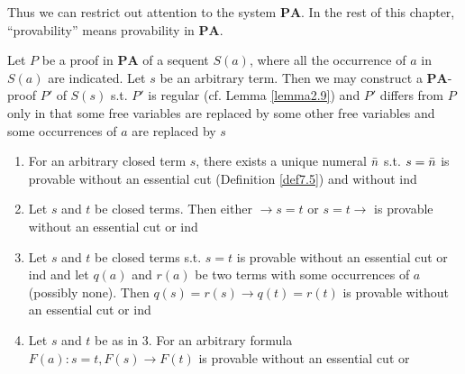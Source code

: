 \documentclass[11pt]{article}
\def \PA {\textbf{PA}}
\begin{document}
Thus we can restrict out attention to the system \(\PA\). In the rest of this chapter,
``provability'' means provability in \(\PA\).

\begin{proposition}[]
Let \(P\) be a proof in \(\PA\) of a sequent \(S(a)\), where all the occurrence of \(a\)
in \(S(a)\) are indicated. Let \(s\) be an arbitrary term. Then we may construct
a \(\PA\)-proof \(P'\) of \(S(s)\) s.t. \(P'\) is regular (cf. Lemma \ref{lemma2.9}) and \(P'\)
differs from \(P\) only in that some free variables are replaced by some other free variables and
some occurrences of \(a\) are replaced by \(s\)
\end{proposition}

\begin{lemma}[]
\label{lemma9.6}
\begin{enumerate}
\item For an arbitrary closed term \(s\), there exists a unique numeral \(\bar{n}\) s.t. \(s=\bar{n}\)
is provable without an essential cut (Definition \ref{def7.5}) and without ind
\item Let \(s\) and \(t\) be closed terms. Then either \(\to s=t\) or \(s=t\to\) is provable without
an essential cut or ind
\item Let \(s\) and \(t\) be closed terms s.t. \(s=t\) is provable without an essential cut or ind
and let \(q(a)\) and \(r(a)\) be two terms with some occurrences of \(a\) (possibly none).
Then \(q(s)=r(s) \to q(t)=r(t)\) is provable without an essential cut or ind
\item Let \(s\) and \(t\) be as in 3. For an arbitrary formula \(F(a):s=t,F(s)\to F(t)\) is provable
without an essential cut or
\end{enumerate}
\end{lemma}
\end{document}
